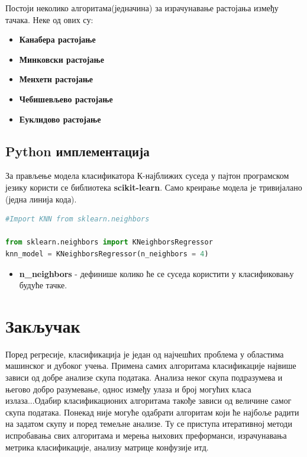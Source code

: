 \documentclass[11pt]{article} %
\begin{document}
Постоји неколико алгоритама(једначина) за израчунавање растојања између тачака. Неке од ових су:

\begin{itemize}
	\item \textbf{Канабера растојање} 
	\item \textbf{Минковски растојање} 
	\item \textbf{Менхетн растојање}
	\item \textbf{Чебишевљево растојање}
	\item \textbf{Еуклидово растојање} 
\end{itemize}

\subsection{Python имплементација}

За прављење модела класификатора К-најближих суседа у пајтон програмском језику користи се библиотека \textbf{scikit-learn}. Само креирање модела је тривијалано (једна линија кода).

\begin{lstlisting}[language=Python,title=Пример 3. Класификатор KNN \footnote{n\_neighbors jе 4, што значи да ће се предикција будуће тачке темељити на 4 наближа суседа} ]
#Import KNN from sklearn.neighbors

from sklearn.neighbors import KNeighborsRegressor
knn_model = KNeighborsRegressor(n_neighbors = 4)

\end{lstlisting}

\begin{itemize}
	\item \textbf{n\_neighbors} - дефинише колико ће се суседа користити у класификовању будуће тачке.
\end{itemize}

\newpage
\section{Закључак}

Поред регресије, класификација је један од најчешћих проблема у областима машинског и дубоког учења. Примена самих алгоритама класификације највише зависи од добре анализе скупа података. Анализа неког скупа подразумева и његово добро разумевање, однос између улаза и број могућих класа излаза...Одабир класификационих алгоритама такође зависи од величине самог скупа података. Понекад није могуће одабрати алгоритам који ће најбоље радити на задатом скупу и поред темељне анализе. Ту се приступа итеративној методи испробавања свих алгоритама и мерења њихових преформанси, израчунавања метрика класификације, анализу матрице конфузије итд.
\end{document}

